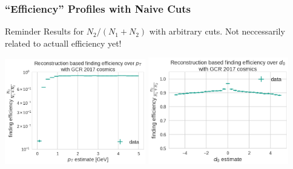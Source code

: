 \documentclass[18pt]{beamer}
\begin{document}
  \begin{frame}
    \frametitle{``Efficiency'' Profiles with Naive Cuts}
    \begin{alertblock}{Reminder}
      Results for $N_2 / (N_1 + N_2)$ with arbitrary cuts. Not neccessarily related to actuall efficiency yet!
    \end{alertblock}
    \begin{center}
      \includegraphics[width=0.46\textwidth]{figures/findeff_pt_data.png}
      \includegraphics[width=0.46\textwidth]{figures/findeff_d0_data.png}
    \end{center}
  \end{frame}
\end{document}
